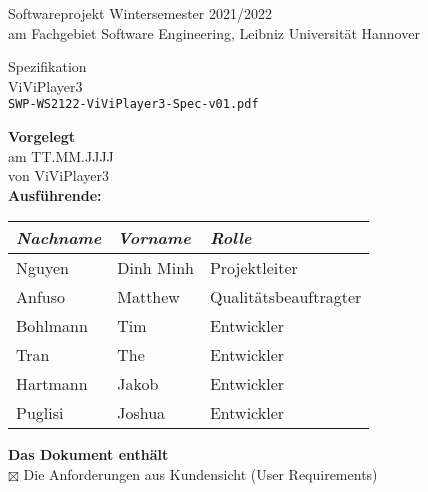 \documentclass[a4paper, 12pt]{article}
\begin{document}
	\thispagestyle{empty} %
	\begin{center}
		{\Huge Softwareprojekt Wintersemester 2021/2022}\\[.35cm]
		{\large am Fachgebiet Software Engineering, Leibniz Universität Hannover}\\[.1cm]
	\end{center}
	\begin{center}
	\colorbox{lightlightgray}{
		\begin{minipage}{\linewidth}
			\begin{center}
				\vspace{0.2cm}
				{\Huge Spezifikation}\\[.1cm]
				{\Huge ViViPlayer3}\\[.3cm]
				\texttt{SWP-WS2122-ViViPlayer3-Spec-v01.pdf}
				\vspace{0.2cm}
			\end{center}
		\end{minipage}
	}
	\end{center}
	\textbf{Vorgelegt}\\
		\hspace*{1cm}am TT.MM.JJJJ \\
		\hspace*{1cm}von ViViPlayer3\\[0.2cm]
	\textbf{Ausführende:}
		\begin{center}
			\begin{tabular}{|l|l|l|}
				\hline
				\textit{Nachname} 				& \textit{Vorname} 	& \textit{Rolle} \\ \hline\hline
				Nguyen							& Dinh Minh			& Projektleiter \\ \hline
				Anfuso							& Matthew			& Qualitätsbeauftragter \\ \hline
				Bohlmann						& Tim				& Entwickler \\ \hline
				Tran							& The				& Entwickler \\ \hline
				Hartmann						& Jakob				& Entwickler \\ \hline
				Puglisi							& Joshua			& Entwickler \\ \hline
			\end{tabular}
		\end{center}
		\vspace{0.3cm}
	\textbf{Das Dokument enthält}\\[0.1cm]
		\hspace*{1cm}$\boxtimes$ Die Anforderungen aus Kundensicht (User Requirements)\\[0.1cm]
\end{document}

